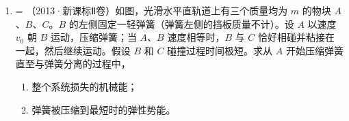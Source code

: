 \documentclass[\gkver]{gaokaozhenti}
\makeatletter
\newcommand{\tiinfo}[2]{{\small\color{gray}（#1）\textcolor{orange!85!black}{\nandu{#2}}}\hspace{0.4em}}
\newenvironment{tibody}
  {\begin{minipage}[t]{\linewidth}\@listdepth=\@ne\leavevmode\ignorespaces}
  {\end{minipage}}
\makeatother
\begin{document}
\begin{enumerate}[resume=tiku]
{	$F_{\text{弹}}=m_{A}a_{A}=m_{B}a_{B}$

	由图可知

	$a_{B}>a_{A}$

	则

	$m_{B}<m_{A}$

	B 正确；

	C．由图可得，$t_{1}$时刻$B$开始运动，此时$A$速度为$v_{0}$，之后$AB$动量守恒，$AB$和弹簧整个系统能量守恒，则

	$m_{A}v_{0}=m_{A}v_{A}+m_{B}v_{B}$

	可得$AB$整体的动能不等于 0，即弹簧的弹性势能会转化为$AB$系统的动能，弹簧的形变量小于$x$，C 错误；

	D．由$a-t$图可知$t_{1}$后$B$脱离墙壁，且弹簧被拉伸，在$t_{1}\sim t_{2}$时间内$AB$组成的系统动量守恒，且在$t_{2}$时刻弹簧的拉伸量达到最大，$A$、$B$共速，由$a-t$图像的面积为$\Delta v$，在$t_{2}$时刻$AB$的速度分别为

	$v_{A}=S_{1}-S_{2}$，$v_{B}=S_{3}$

	$A$、$B$共速，则

	$S_{1}-S_{2}=S_{3}$

	D 正确。

	故选 ABD。
}

\item
\begin{tibody}
\tiinfo{2013·新课标Ⅱ卷}{3}如图，光滑水平直轨道上有三个质量均为 $m$ 的物块 $A$、$B$、$C$。$B$ 的左侧固定一轻弹簧（弹簧左侧的挡板质量不计）。设 $A$ 以速度 $v_{0}$ 朝 $B$ 运动，压缩弹簧；当 $A$、$B$ 速度相等时，$B$ 与 $C$ 恰好相碰并粘接在一起，然后继续运动。假设 $B$ 和 $C$ 碰撞过程时间极短。求从 $A$ 开始压缩弹簧直至与弹簧分离的过程中，
\begin{enumerate}
	\item
	整个系统损失的机械能；
	\item
	弹簧被压缩到最短时的弹性势能。
\end{enumerate}

\end{tibody}

\end{enumerate}
\end{document}
